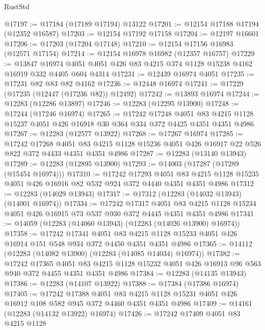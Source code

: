 \begin{lexlean}{RustStd}
\begin{coremodule}
@17197 := @17184 (@17189 @17194) @13122
@17201 := @12154 @17188 @17194 (@12352 @16587)
@17203 := @12154 @17192 @17158
@17204 := @12197 @16601
@17206 := @17203 (@17204 @17148)
@17210 := @12154 @17156 @16983 (@12571 @17154)
@17214 := @12154 @16978 @16982 (@12357 @16757)
@17229 := @13847
    @16974
    @4051
    @4051
    @426
    @83
    @4215
    @374
    @1128
    @15238
    @4162
    @16919
    @332
    @4405
    @604
    @4314
@17231 := @12439 @16974 @4051
@17235 := @17231 @82 @83 @82 @4162
@17236 := @12448 @16974
@17241 := @17229 (@17235 (@12447 (@17236 @82)) @12492)
@17242 := @13893 @16974
@17244 := @12283 (@12286 @13897)
@17246 := @12283 (@12295 @13900)
@17248 := @17244 (@17246 @16974)
@17265 := @17242
    @17248
    @4051
    @83
    @4215
    @1128
    @15237
    @4051
    @426
    @16918
    @30
    @364
    @334
    @372
    @4425
    @4351
    @4351
    @4986
@17267 := @12283 (@12577 @13922)
@17268 := @17267 @16974
@17285 := @17242
    @17268
    @4051
    @83
    @4215
    @1128
    @15236
    @4051
    @426
    @16917
    @22
    @526
    @822
    @372
    @4433
    @4351
    @4351
    @4986
@17287 := @12283 (@13140 @13943)
@17289 := @12283 (@12895 @13900)
@17293 := @14003 (@17287 (@17289 (@15454 @16974)))
@17310 := @17242
    @17293
    @4051
    @83
    @4215
    @1128
    @15235
    @4051
    @426
    @16916
    @82
    @532
    @924
    @372
    @4440
    @4351
    @4351
    @4986
@17312 := @12283 (@14029 @13943)
@17317 := @17312 (@12283 (@14032 @13943) (@14001 @16974))
@17334 := @17242
    @17317
    @4051
    @83
    @4215
    @1128
    @15234
    @4051
    @426
    @16915
    @73
    @537
    @930
    @372
    @4445
    @4351
    @4351
    @4986
@17341 := @14059 (@12283 (@14060 @13943) (@12283 (@14026 @13900) @16974))
@17358 := @17242
    @17341
    @4051
    @83
    @4215
    @1128
    @15233
    @4051
    @426
    @16914
    @151
    @548
    @934
    @372
    @4450
    @4351
    @4351
    @4986
@17365 := @14112 (@12283 (@14082 @13900) (@12283 (@14085 @14034) @16974))
@17382 := @17242
    @17365
    @4051
    @83
    @4215
    @1128
    @15232
    @4051
    @426
    @16913
    @96
    @563
    @940
    @372
    @4455
    @4351
    @4351
    @4986
@17384 := @12283 (@14135 @13943)
@17386 := @12283 (@14107 @13922)
@17388 := @17384 (@17386 @16974)
@17405 := @17242
    @17388
    @4051
    @83
    @4215
    @1128
    @15231
    @4051
    @426
    @16912
    @108
    @582
    @945
    @372
    @4460
    @4351
    @4351
    @4986
@17409 := @14161 (@12283 (@14132 @13922) @16974)
@17426 := @17242
    @17409
    @4051
    @83
    @4215
    @1128

\end{coremodule}
\end{lexlean}
